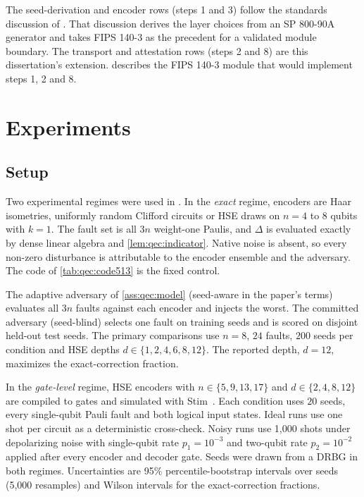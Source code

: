 The seed-derivation and encoder rows (steps 1 and 3) follow the standards discussion of \cite{guo2026qecaudit}. That discussion derives the layer choices from an SP 800-90A generator and takes FIPS 140-3 as the precedent for a validated module boundary. The transport and attestation rows (steps 2 and 8) are this dissertation's extension.  describes the FIPS 140-3 module that would implement steps 1, 2 and 8.

\section{Experiments}\label{sec:qec:experiments}

\subsection{Setup}\label{sec:qec:setup}

Two experimental regimes were used in \cite{guo2026qecaudit}. In the \emph{exact} regime, encoders are Haar isometries, uniformly random Clifford circuits or HSE draws on $n=4$ to $8$ qubits with $k=1$. The fault set is all $3n$ weight-one Paulis, and $\Delta$ is evaluated exactly by dense linear algebra and \cref{lem:qec:indicator}. Native noise is absent, so every non-zero disturbance is attributable to the encoder ensemble and the adversary. The  code of \cref{tab:qec:code513} is the fixed control.

The adaptive adversary of \cref{ass:qec:model} (seed-aware in the paper's terms) evaluates all $3n$ faults against each encoder and injects the worst. The committed adversary (seed-blind) selects one fault on training seeds and is scored on disjoint held-out test seeds. The primary comparisons use $n=8$, $24$ faults, $200$ seeds per condition and HSE depths $d\in\{1,2,4,6,8,12\}$. The reported depth, $d=12$, maximizes the exact-correction fraction.

In the \emph{gate-level} regime, HSE encoders with $n\in\{5,9,13,17\}$ and $d\in\{2,4,8,12\}$ are compiled to gates and simulated with Stim~\cite{gidney2021stim}. Each condition uses $20$ seeds, every single-qubit Pauli fault and both logical input states. Ideal runs use one shot per circuit as a deterministic cross-check. Noisy runs use 1,000 shots under depolarizing noise with single-qubit rate $p_1=10^{-3}$ and two-qubit rate $p_2=10^{-2}$ applied after every encoder and decoder gate. Seeds were drawn from a DRBG in both regimes. Uncertainties are 95\% percentile-bootstrap intervals over seeds (5,000 resamples) and Wilson intervals for the exact-correction fractions.


